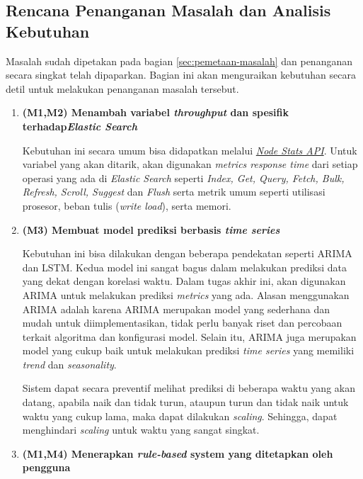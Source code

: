 \subsection{Rencana Penanganan Masalah dan Analisis Kebutuhan}

Masalah sudah dipetakan pada bagian \ref{sec:pemetaan-masalah} dan penanganan secara singkat telah dipaparkan. Bagian ini akan menguraikan kebutuhan secara detil untuk melakukan penanganan masalah tersebut.

\begin{enumerate}
    \item \textbf{(M1,M2) Menambah variabel \textit{throughput} dan spesifik terhadap\textit{Elastic Search}}
    
    Kebutuhan ini secara umum bisa didapatkan melalui \href{https://www.elastic.co/guide/en/elasticsearch/reference/current/cluster-nodes-stats.html}{\textit{Node Stats API}}. Untuk variabel yang akan ditarik, akan digunakan \textit{metrics response time} dari setiap operasi yang ada di \textit{Elastic Search} seperti \textit{Index, Get, Query, Fetch, Bulk, Refresh, Scroll, Suggest} dan \textit{Flush} serta metrik umum seperti utilisasi prosesor, beban tulis (\textit{write load}), serta memori.

    \item \textbf{(M3) Membuat model prediksi berbasis \textit{time series}}
    
    Kebutuhan ini bisa dilakukan dengan beberapa pendekatan seperti ARIMA dan LSTM. Kedua model ini sangat bagus dalam melakukan prediksi data yang dekat dengan korelasi waktu. Dalam tugas akhir ini, akan digunakan ARIMA untuk melakukan prediksi \textit{metrics} yang ada. Alasan menggunakan ARIMA adalah karena ARIMA merupakan model yang sederhana dan mudah untuk diimplementasikan, tidak perlu banyak riset dan percobaan terkait algoritma dan konfigurasi model. Selain itu, ARIMA juga merupakan model yang cukup baik untuk melakukan prediksi \textit{time series} yang memiliki \textit{trend} dan \textit{seasonality}.

    Sistem dapat secara preventif melihat prediksi di beberapa waktu yang akan datang, apabila naik dan tidak turun, ataupun turun dan tidak naik untuk waktu yang cukup lama, maka dapat dilakukan \textit{scaling}. Sehingga, dapat menghindari \textit{scaling} untuk waktu yang sangat singkat.

    \item \textbf{(M1,M4) Menerapkan \textit{rule-based} system yang ditetapkan oleh pengguna}
    

\end{enumerate}
